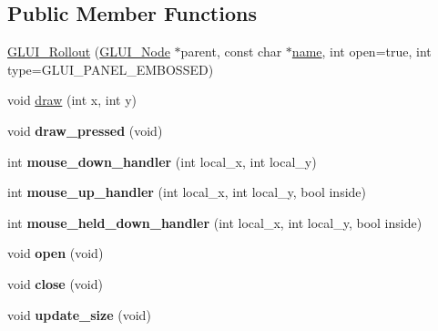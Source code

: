 \subsection*{Public Member Functions}
\begin{DoxyCompactItemize}
\item 
\hyperlink{classGLUI__Rollout_a24c6af54874ab79245debf924048bee2}{G\-L\-U\-I\-\_\-\-Rollout} (\hyperlink{classGLUI__Node}{G\-L\-U\-I\-\_\-\-Node} $\ast$parent, const char $\ast$\hyperlink{classGLUI__Control_aa95b97d50df45335fc33f0af03958eb3}{name}, int open=true, int type=G\-L\-U\-I\-\_\-\-P\-A\-N\-E\-L\-\_\-\-E\-M\-B\-O\-S\-S\-E\-D)
\item 
void \hyperlink{classGLUI__Rollout_ae3ff0bbeb04f22aa5489cf542b6e3fbb}{draw} (int x, int y)
\item 
\hypertarget{classGLUI__Rollout_aa3fbc3548f10ee8209d2eb0b46c05b6d}{void {\bfseries draw\-\_\-pressed} (void)}\label{classGLUI__Rollout_aa3fbc3548f10ee8209d2eb0b46c05b6d}

\item 
\hypertarget{classGLUI__Rollout_abbd554515b6f0136f6aa89d260b826e5}{int {\bfseries mouse\-\_\-down\-\_\-handler} (int local\-\_\-x, int local\-\_\-y)}\label{classGLUI__Rollout_abbd554515b6f0136f6aa89d260b826e5}

\item 
\hypertarget{classGLUI__Rollout_ac7df2e007640c4a21deb494c8eb8ca03}{int {\bfseries mouse\-\_\-up\-\_\-handler} (int local\-\_\-x, int local\-\_\-y, bool inside)}\label{classGLUI__Rollout_ac7df2e007640c4a21deb494c8eb8ca03}

\item 
\hypertarget{classGLUI__Rollout_a55eb4c45f7857bbae04e857aadf2b505}{int {\bfseries mouse\-\_\-held\-\_\-down\-\_\-handler} (int local\-\_\-x, int local\-\_\-y, bool inside)}\label{classGLUI__Rollout_a55eb4c45f7857bbae04e857aadf2b505}

\item 
\hypertarget{classGLUI__Rollout_a431c2fee6adb56c18d0ed8ac9a01eacb}{void {\bfseries open} (void)}\label{classGLUI__Rollout_a431c2fee6adb56c18d0ed8ac9a01eacb}

\item 
\hypertarget{classGLUI__Rollout_a16ff61e6541e9872fc82f91c75263e16}{void {\bfseries close} (void)}\label{classGLUI__Rollout_a16ff61e6541e9872fc82f91c75263e16}

\item 
\hypertarget{classGLUI__Rollout_af6f664a8ca31757bc1e5926d5eaf2827}{void {\bfseries update\-\_\-size} (void)}\label{classGLUI__Rollout_af6f664a8ca31757bc1e5926d5eaf2827}

\end{DoxyCompactItemize}
